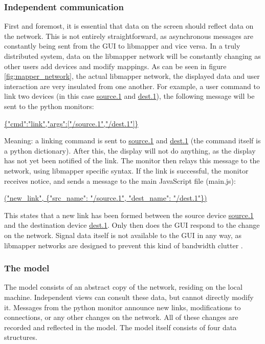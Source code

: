 		\subsubsection{Independent communication}

First and foremost, it is essential that data on the screen should reflect data on the network. This is not entirely straightforward, as asynchronous messages are constantly being sent from the GUI to libmapper and vice versa. In a truly distributed system, data on the libmapper network will be constantly changing as other users add devices and modify mappings. As can be seen in figure \ref{fig:mapper_network}, the actual libmapper network, the displayed data and user interaction are very insulated from one another. For example, a user command to link two devices (in this case \url{source.1} and \url{dest.1}), the following message will be sent to the python monitors:

\url{ {"cmd":"link","args":["/source.1","/dest.1"]} }

Meaning: a linking command is sent to \url{source.1} and \url{dest.1} (the command itself is a python dictionary). After this, the display will not do anything, as the display has not yet been notified of the link. The monitor then relays this message to the network, using libmapper specific syntax. If the link is successful, the monitor receives notice, and sends a message to the main JavaScript file (main.js):

\url{("new_link", {"src_name": "/source.1", "dest_name": "/dest.1"}) }

This states that a new link has been formed between the source device \url{source.1} and the destination device \url{dest.1}. Only then does the GUI respond to the change on the network. Signal data itself is not available to the GUI in any way, as libmapper networks are designed to prevent this kind of bandwidth clutter .

		\subsubsection{The model}

The model consists of an abstract copy of the network, residing on the local machine. Independent views can consult these data, but cannot directly modify it. Messages from the python monitor announce new links, modifications to connections, or any other changes on the network. All of these changes are recorded and reflected in the model. The model itself consists of four data structures.

